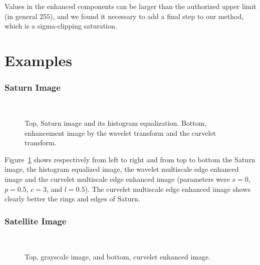 Values in the enhanced components can be larger than the 
authorized upper limit (in general $255$),
and we found it necessary to add a final step to our method, which is
a sigma-clipping saturation.

\section{Examples}
\subsubsection*{Saturn Image}
\begin{figure}[htb]
\centerline{  
\vbox{
\hbox{
}
\hbox{
}}
}
\caption{Top, Saturn image and its histogram equalization. Bottom,
enhancement image by the wavelet transform and the curvelet transform.}
\label{fig_saturn_cur_enhance}
\end{figure}

Figure~\ref{fig_saturn_cur_enhance} shows respectively from left to right
and from top to bottom 
the Saturn image, the histogram equalized image, the wavelet multiscale
edge enhanced image and the curvelet multiscale
edge enhanced image (parameters were $s=0$, $p=0.5$, $c=3$, and $l=0.5$). 
The curvelet multiscale edge enhanced image shows clearly better the 
rings and edges of Saturn.

\subsubsection*{Satellite Image}
\begin{figure}[htb]
\centerline{  
\vbox{
\hbox{
}
\hbox{
}}
}
\caption{Top, grayscale image, and bottom,
curvelet enhanced image.}
\label{fig_marseille_bw_cur_enhance}
\end{figure}
 
